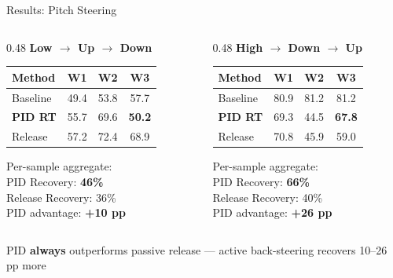 \documentclass[aspectratio=169]{beamer}
\begin{document}
\begin{frame}{Results: Pitch Steering}

\begin{columns}[T]
\begin{column}{0.48\textwidth}
\textbf{Low $\to$ Up $\to$ Down}
\vspace{0.3em}

\begin{small}
\begin{tabular}{lccc}
    \toprule
    Method & W1 & W2 & W3 \\
    \midrule
    \color{basegray}Baseline & 49.4 & 53.8 & 57.7 \\
    \color{pidblue}\textbf{PID RT} & 55.7 & 69.6 & \textbf{50.2} \\
    \color{releasegreen}Release & 57.2 & 72.4 & 68.9 \\
    \bottomrule
\end{tabular}
\end{small}

\vspace{0.5em}
Per-sample aggregate:\\[3pt]
\color{pidblue}PID Recovery: \textbf{46\%}\color{black}\\[2pt]
\color{releasegreen}Release Recovery: 36\%\color{black}\\[2pt]
PID advantage: \textbf{+10 pp}
\end{column}

\begin{column}{0.48\textwidth}
\textbf{High $\to$ Down $\to$ Up}
\vspace{0.3em}

\begin{small}
\begin{tabular}{lccc}
    \toprule
    Method & W1 & W2 & W3 \\
    \midrule
    \color{basegray}Baseline & 80.9 & 81.2 & 81.2 \\
    \color{pidblue}\textbf{PID RT} & 69.3 & 44.5 & \textbf{67.8} \\
    \color{releasegreen}Release & 70.8 & 45.9 & 59.0 \\
    \bottomrule
\end{tabular}
\end{small}

\vspace{0.5em}
Per-sample aggregate:\\[3pt]
\color{pidblue}PID Recovery: \textbf{66\%}\color{black}\\[2pt]
\color{releasegreen}Release Recovery: 40\%\color{black}\\[2pt]
PID advantage: \textbf{+26 pp}
\end{column}
\end{columns}

\vspace{1em}
\begin{center}
PID \textbf{always} outperforms passive release --- active back-steering recovers 10--26 pp more
\end{center}

\end{frame}
\end{document}
